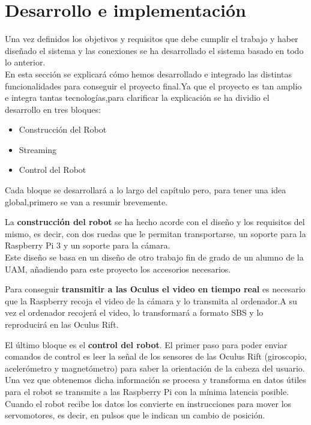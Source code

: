 \documentclass[twoside, 11pt]{epstfg}
\begin{document}
\chapter{Desarrollo e implementación}

Una vez definidos los objetivos y requisitos que debe cumplir el trabajo y haber diseñado el sistema y las conexiones se ha desarrollado el sistema basado en todo lo anterior.\\
En esta sección se explicará cómo hemos desarrollado e integrado las distintas funcionalidades para conseguir el proyecto final.Ya que el proyecto es tan amplio e integra tantas tecnologías,para clarificar la explicación se ha dividio el desarrollo en tres bloques:
\begin{itemize}
	\item Construcción del Robot
	\item Streaming 
	\item Control del Robot
\end{itemize}
Cada bloque se desarrollará a lo largo del capítulo pero, para tener una idea global,primero se van a resumir brevemente.

La \textbf{construcción del robot} se ha hecho acorde con el diseño y los requisitos del mismo, es decir, con dos ruedas que le permitan transportarse, un soporte para la Raspberry Pi 3 y un soporte para la cámara.\\
Este diseño se basa en un diseño de otro trabajo fin de grado de un alumno de la UAM, añadiendo para este proyecto los accesorios necesarios.

Para conseguir \textbf{transmitir a las Oculus el video en tiempo real} es necesario que la Raspberry recoja el video de la cámara y lo transmita al ordenador.A su vez el ordenador recojerá el video, lo transformará a formato SBS y lo reproducirá en las Oculus Rift. 

El último bloque es el \textbf{control del robot}. El primer paso para poder enviar comandos de control es leer la señal de los sensores de las Oculus Rift (giroscopio, acelerómetro y magnetómetro) para saber la orientación de la cabeza del usuario.\\
Una vez que obtenemos dicha información se procesa y transforma en datos útiles para el robot se transmite a las Raspberry Pi con la mínima latencia posible.\\
Cuando el robot recibe los datos los convierte en instrucciones para mover los servomotores, es decir, en pulsos que le indican un cambio de posición.
	
\end{document}
